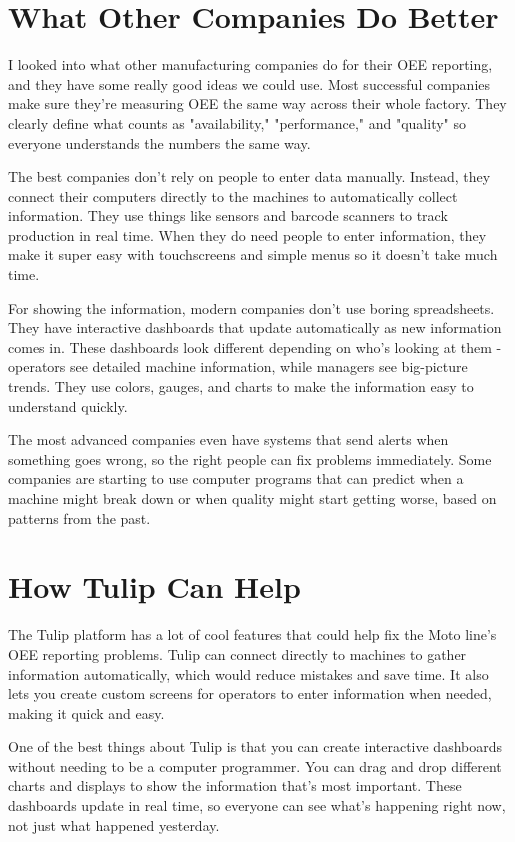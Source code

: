 \documentclass[11pt]{article}
\begin{document}
\section{What Other Companies Do Better}

I looked into what other manufacturing companies do for their OEE reporting, and they have some really good ideas we could use. Most successful companies make sure they're measuring OEE the same way across their whole factory. They clearly define what counts as "availability," "performance," and "quality" so everyone understands the numbers the same way.

The best companies don't rely on people to enter data manually. Instead, they connect their computers directly to the machines to automatically collect information. They use things like sensors and barcode scanners to track production in real time. When they do need people to enter information, they make it super easy with touchscreens and simple menus so it doesn't take much time.

For showing the information, modern companies don't use boring spreadsheets. They have interactive dashboards that update automatically as new information comes in. These dashboards look different depending on who's looking at them - operators see detailed machine information, while managers see big-picture trends. They use colors, gauges, and charts to make the information easy to understand quickly.

The most advanced companies even have systems that send alerts when something goes wrong, so the right people can fix problems immediately. Some companies are starting to use computer programs that can predict when a machine might break down or when quality might start getting worse, based on patterns from the past.

\section{How Tulip Can Help}

The Tulip platform has a lot of cool features that could help fix the Moto line's OEE reporting problems. Tulip can connect directly to machines to gather information automatically, which would reduce mistakes and save time. It also lets you create custom screens for operators to enter information when needed, making it quick and easy.

One of the best things about Tulip is that you can create interactive dashboards without needing to be a computer programmer. You can drag and drop different charts and displays to show the information that's most important. These dashboards update in real time, so everyone can see what's happening right now, not just what happened yesterday.
\end{document}
